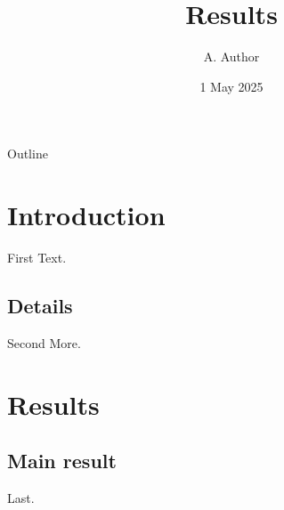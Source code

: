 \documentclass{beamer}
\title{Results}
\author{A. Author}
\date{1 May 2025}
\begin{document}
\begin{frame}{Outline}
\tableofcontents
\end{frame}
\section{Introduction}
\begin{frame}{First}
Text.
\end{frame}
\subsection{Details}
\begin{frame}{Second}
More.
\end{frame}
\section{Results}
\subsection{Main result}
\begin{frame}
Last.
\end{frame}
\end{document}
